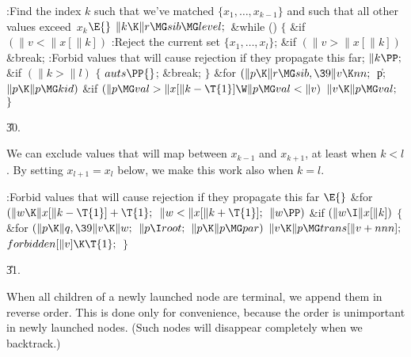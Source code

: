 \B{}:Find the index $k$ such that we've matched $%
\{x_1,\ldots,x_{k-1}\}$ and such that all other values exceed~$x_k$\X${}\E{}$\6
$\|k\K\|r\MG\\{sib}\MG\\{level};{}$\6
\&{while} ()\5
${}\{{}$\1\6
\&{if} ${}(\|v<\|x[\|k]){}$\1\5
:Reject the current set $\{x_1,\ldots,x_l\}$\X;\2\6
\&{if} ${}(\|v>\|x[\|k]){}$\1\5
\&{break};\2\6
:Forbid values that will cause rejection if they propagate this far\X;\6
${}\|k\PP;{}$\6
\&{if} ${}(\|k>\|l){}$\5
${}\{{}$\1\6
${}\\{auts}\PP{}$;\6
\&{break};\6
\4${}\}{}$\2\6
\&{for} ${}(\|p\K\|r\MG\\{sib},\39\|v\K\\{nn};{}$ \|p; ${}\|p\K\|p\MG%
\\{kid}){}$\1\6
\&{if} ${}(\|p\MG\\{val}>\|x[\|k-\T{1}]\W\|p\MG\\{val}<\|v){}$\1\5
${}\|v\K\|p\MG\\{val};{}$\2\2\6
\4${}\}{}$\2\par
\U30.\fi

We can exclude values that will map between $x_{k-1}$
and $x_{k+1}$,
at least when $k<l$. By setting $x_{l+1}=x_l$ below, we make this
work also when $k=l$.

\Y\B\4:Forbid values that will cause rejection if they propagate this far%
\X${}\E{}$\6
\&{for} ${}(\|w\K\|x[\|k-\T{1}]+\T{1};{}$ ${}\|w<\|x[\|k+\T{1}];{}$ ${}\|w%
\PP){}$\1\6
\&{if} ${}(\|w\I\|x[\|k]){}$\5
${}\{{}$\1\6
\&{for} ${}(\|p\K\|q,\39\|v\K\|w;{}$ ${}\|p\I\\{root};{}$ ${}\|p\K\|p\MG%
\\{par}){}$\1\5
${}\|v\K\|p\MG\\{trans}[\|v+\\{nnn}];{}$\2\6
${}\\{forbidden}[\|v]\K\T{1};{}$\6
\4${}\}{}$\2\2\par
\U31.\fi

When all children of a newly launched node  are
terminal,
we append them in reverse order. This is done only for convenience,
because the order
is unimportant in newly launched nodes. (Such nodes will disappear completely
when we backtrack.)


